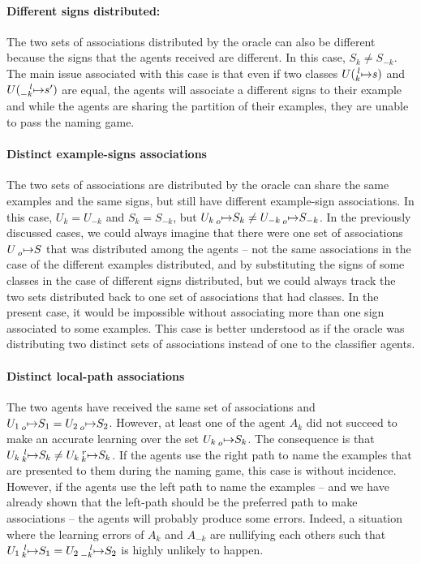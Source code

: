 \paragraph{Different signs distributed:} The two sets of associations distributed by the oracle can also be different because the signs that the agents received are different. In this case, $S_{k} \neq S_{-k}$. The main issue associated with this case is that even if two classes $U(\prescript{l}{k}{\mapsto} s)$ and $U(\prescript{l}{-k}{\mapsto} s')$ are equal, the agents will associate a different signs to their example and while the agents are sharing the partition of their examples, they are unable to pass the naming game.

\paragraph{Distinct example-signs associations} The two sets of associations are distributed by the oracle can share the same examples and the same signs, but still have different example-sign associations. In this case,  $U_{k} = U_{-k}$ and $S_{k} = S_{-k}$, but $U_{k} \prescript{}{o}{\mapsto} S_{k} \neq U_{-k} \prescript{}{o}{\mapsto} S_{-k}$. In the previously discussed cases, we could always imagine that there were one set of associations $U \prescript{}{o}{\mapsto} S$ that was distributed among the agents -- not the same associations in the case of the different examples distributed, and by substituting the signs of some classes in the case of different signs distributed, but we could always track the two sets distributed back to one set of associations that had classes. In the present case, it would be impossible without associating more than one sign associated to some examples. This case is better understood as if the oracle was distributing two distinct sets of associations instead of one to the classifier agents.

\paragraph{Distinct local-path associations} The two agents have received the same set of associations and $U_{1} \prescript{}{o}{\mapsto} S_{1} = U_{2} \prescript{}{o}{\mapsto} S_{2}$. However, at least one of the agent $A_{k}$ did not succeed to make an accurate learning over the set $U_{k} \prescript{}{o}{\mapsto} S_{k}$. The consequence is that $U_{k} \prescript{l}{k}{\mapsto} S_{k} \neq U_{k} \prescript{r}{k}{\mapsto} S_{k}$. If the agents use the right path to name the examples that are presented to them during the naming game, this case is without incidence. However, if the agents use the left path to name the examples -- and we have already shown that the left-path should be the preferred path to make associations -- the agents will probably produce some errors. Indeed, a situation where the learning errors of $A_{k}$ and $A_{-k}$ are nullifying each others such that $U_{1} \prescript{l}{k}{\mapsto} S_{1} = U_{2} \prescript{l}{-k}{\mapsto} S_{2}$ is highly unlikely to happen.

